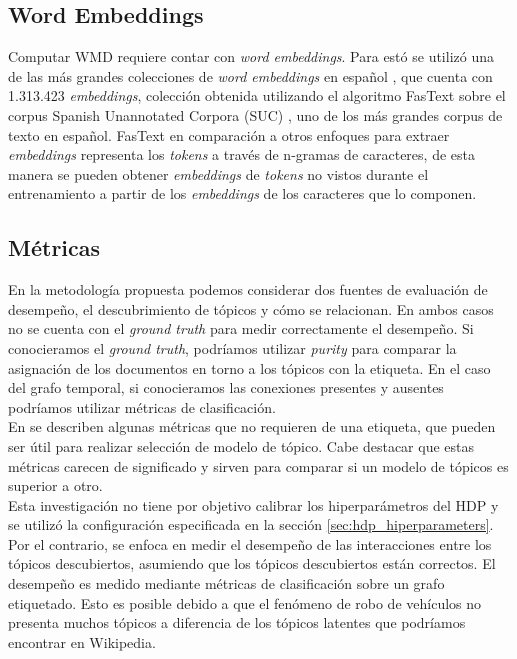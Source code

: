 \subsection{Word Embeddings}

Computar WMD requiere contar con \textit{word embeddings}. Para estó se utilizó una de las más grandes colecciones de \textit{word embeddings} en español \citep{fastextSUC}, que cuenta con 1.313.423 \textit{embeddings}, colección obtenida utilizando el algoritmo FasText \citep{bojanowski2017enriching} sobre el corpus Spanish Unannotated Corpora (SUC) \citep{josecanneteSUC}, uno de los más grandes corpus de texto en español. FasText en comparación a otros enfoques para extraer \textit{embeddings} representa los \textit{tokens} a través de n-gramas de caracteres, de esta manera se pueden obtener \textit{embeddings} de \textit{tokens} no vistos durante el entrenamiento a partir de los \textit{embeddings} de los caracteres que lo componen.

\subsection{Métricas}

En la metodología propuesta podemos considerar dos fuentes de evaluación de desempeño, el descubrimiento de tópicos y cómo se relacionan. En ambos casos no se cuenta con el \textit{ground truth} para medir correctamente el desempeño. Si conocieramos el \textit{ground truth}, podríamos utilizar \textit{purity} \citep{manning2008introduction} para comparar la asignación de los documentos en torno a los tópicos con la etiqueta. En el caso del grafo temporal, si conocieramos las conexiones presentes y ausentes podríamos utilizar métricas de clasificación.\\

En \citep{blei2003latent,griffiths2004finding,cao2009density,arun2010finding,deveaud2014accurate,zhang2017lda} se describen algunas métricas que no requieren de una etiqueta, que pueden ser útil para realizar selección de modelo de tópico. Cabe destacar que estas métricas carecen de significado y sirven para comparar si un modelo de tópicos es superior a otro.\\

Esta investigación no tiene por objetivo calibrar los hiperparámetros del HDP y se utilizó la configuración especificada en la sección \ref{sec:hdp_hiperparameters}. Por el contrario, se enfoca en medir el desempeño de las interacciones entre los tópicos descubiertos, asumiendo que los tópicos descubiertos están correctos. El desempeño es medido mediante métricas de clasificación sobre un grafo etiquetado. Esto es posible  debido a que el fenómeno de robo de vehículos no presenta muchos tópicos a diferencia de los tópicos latentes que podríamos encontrar en Wikipedia.\\

